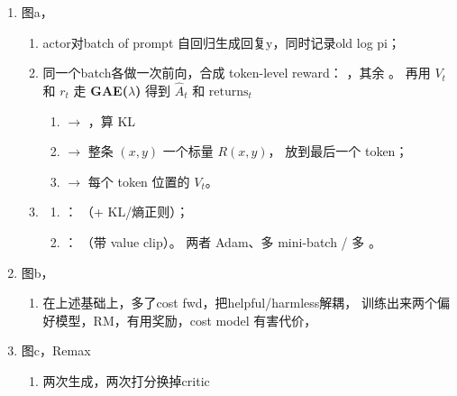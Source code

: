\documentclass[UTF8,fontset=fandol]{ctexart}
\begin{document}
\begin{enumerate}
  \item 图a，
  \begin{enumerate}
    \item actor对batch of prompt 自回归生成回复y，同时记录old log pi；
    \item 同一个batch各做一次前向，合成 token-level reward：
      ，其余 。
      再用 $V_t$ 和 $r_t$ 走 \textbf{GAE($\lambda$)} 得到 $\hat{A}_t$ 和
      $\text{returns}_t$
      \begin{enumerate}
        \item {} $\to$ ，算 KL        %
        \item {} $\to$ 整条 $(x, y)$ 一个标量 $R(x,y)$，
          放到最后一个 token；                                    %
        \item {} $\to$ 每个 token 位置的 $V_t$。    %
      \end{enumerate}
    \item {}
      \begin{enumerate}
        \item {}：
          （+ KL/熵正则）；
        \item {}：
          （带 value clip）。
          两者 Adam、多 mini-batch / 多 。
      \end{enumerate}
  \end{enumerate}
  \item 图b，
  \begin{enumerate}
    \item 在上述基础上，多了cost fwd，把helpful/harmless解耦，
      训练出来两个偏好模型，RM，有用奖励，cost model 有害代价，
  \end{enumerate}
  \item 图c，Remax
  \begin{enumerate}
    \item 两次生成，两次打分换掉critic
  \end{enumerate}
\end{enumerate}
\end{document}
